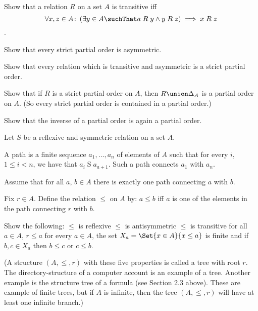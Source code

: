 \documentclass{report}
\begin{document}
\begin{Exercise} [number=23]
  Show that a relation $R$ on a set $A$ is transitive
  iff \[\forall{x,z \in A} \colon \left( \exists{y \in A} \suchThat
    a \R y \land y \R z \right) \implies x \R z\].
\end{Exercise}

\begin{Exercise} [number=28]
  Show that every strict partial order is asymmetric.
\end{Exercise}

\begin{Exercise} [number=29]
  Show that every relation which is transitive and asymmetric is a
  strict partial order.
\end{Exercise}

\begin{Exercise} [number=30]
  Show that if $R$ is a strict partial order on $A$, then $R \union
  \Delta_A$ is a partial order on $A$. (So every strict partial order
  is contained in a partial order.)
\end{Exercise}

\begin{Exercise} [number=31]
  Show that the inverse of a partial order is again a partial order.
\end{Exercise}

\begin{Exercise} [number=32]
  
  Let $S$ be a reflexive and symmetric relation on a set $A$.

  A path is a finite sequence $a_1, \dots, a_n$ of elements of $A$
  such that for every $i$, $1 \le i < n$, we have that
  $a_{i}\mathrel{S}a_{a+1}$. Such a path connects $a_1$ with $a_n$.
  
  Assume that for all $a$, $b \in A$ there is exactly one path
  connecting $a$ with $b$.

  Fix $r \in A$. Define the relation $\le$ on $A$ by: $a \le b$ iff
  $a$ is one of the elements in the path connecting $r$ with $b$.

  Show the following:
  \Question $\le$ is reflexive
  \Question $\le$ is antisymmetric
  \Question $\le$ is transitive
  \Question for all $a \in A$, $r \le a$
  \Question for every $a \in A$, the set $X_a = \Set{x \in A}{x \le
    a}$ is finite and if $b,c \in X_a$ then $b \le c$ or $c \le b$.

  (A structure $(A,\le,r)$ with these five properties is called a
  tree with root $r$. The directory-structure of a computer account is
  an example of a tree. Another example is the structure tree of a
  formula (see Section 2.3 above). These are example of finite trees,
  but if $A$ is infinite, then the tree $(A,\le,r)$ will have at
  least one infinite branch.)
\end{Exercise}
\end{document}
